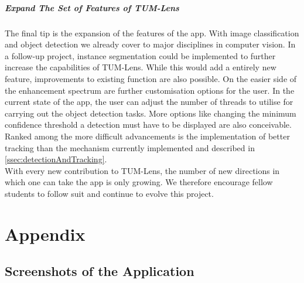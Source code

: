 \documentclass[
			   fontsize=11pt,
               paper=a4,
               bibliography=totoc,
               idxtotoc,
               headsepline,
               footsepline,
               footinclude=false,
               BCOR=12mm,
               DIV=13,
               openany,   %
               ]
               {scrbook}
\begin{document}
\subsubsection{Expand The Set of Features of TUM-Lens}

The final tip is the expansion of the features of the app. With image classification and object detection we already cover to major disciplines in computer vision. In a follow-up project, instance segmentation could be implemented to further increase the capabilities of TUM-Lens. While this would add a entirely new feature, improvements to existing function are also possible. On the easier side of the enhancement spectrum are further customisation options for the user. In the current state of the app, the user can adjust the number of threads to utilise for carrying out the object detection tasks. More options like changing the minimum confidence threshold a detection must have to be displayed are also conceivable. Ranked among the more difficult advancements is the implementation of better tracking than the mechanism currently implemented and described in \autoref{ssec:detectionAndTracking}. \\

With every new contribution to TUM-Lens, the number of new directions in which one can take the app is only growing. We therefore encourage fellow students to follow suit and continue to evolve this project.




\appendix


\part{Appendix}


\chapter{Screenshots of the Application}
\end{document}
